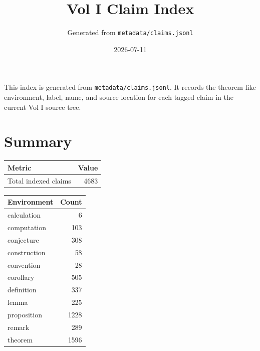 \documentclass[11pt]{article}
\begin{document}
\title{Vol I Claim Index}
\author{Generated from \texttt{metadata/claims.jsonl}}
\date{2026-07-11}
\maketitle
This index is generated from \texttt{metadata/claims.jsonl}. It records the theorem-like environment, label, name, and source location for each tagged claim in the current Vol I source tree.

\section*{Summary}
\begin{tabular}{lr}
\toprule
Metric & Value\\
\midrule
Total indexed claims & 4683\\
\bottomrule
\end{tabular}

\bigskip
\begin{tabular}{lr}
\toprule
Environment & Count\\
\midrule
calculation & 6\\
computation & 103\\
conjecture & 308\\
construction & 58\\
convention & 28\\
corollary & 505\\
definition & 337\\
lemma & 225\\
proposition & 1228\\
remark & 289\\
theorem & 1596\\
\bottomrule
\end{tabular}
\end{document}
